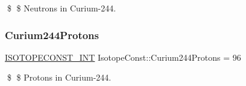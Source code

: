 \$ \$ Neutrons in Curium-\/244. \mbox{\label{group___isotope_const-_curium-_cm244_gae7385e24d9daef379ee79dd0d7be36ac}} 
\subsubsection{\texorpdfstring{Curium244\+Protons}{Curium244Protons}}
{\footnotesize\ttfamily \mbox{\hyperlink{group___isotope_const-_macros_ga5f18360b3e99483a35c32d789e62621c}{I\+S\+O\+T\+O\+P\+E\+C\+O\+N\+S\+T\+\_\+\+I\+NT}} Isotope\+Const\+::\+Curium244\+Protons = 96}

\$ \$ Protons in Curium-\/244. 